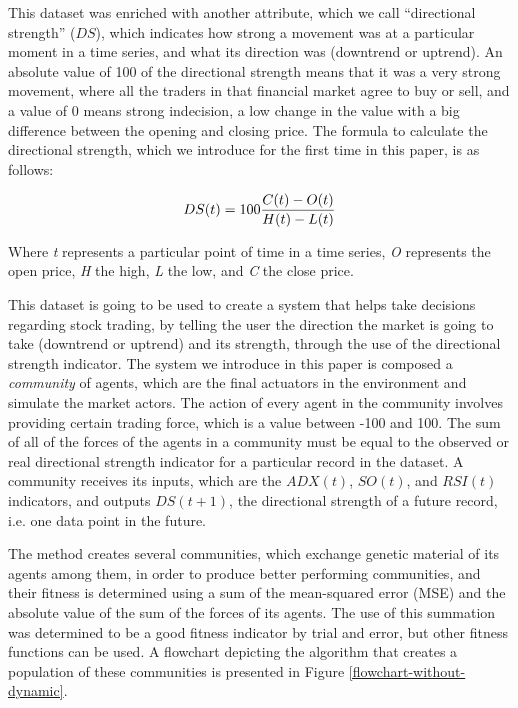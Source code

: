 \documentclass[a4paper,twoside]{article}
\begin{document}
This dataset was enriched with another attribute, which we call
``directional strength'' ($DS$), which indicates how strong a movement was at
a particular moment in a time series, and 
what its direction was (downtrend or uptrend). An absolute value of
100 of the directional strength means that it was a very strong
movement, where all the traders in that financial market agree to buy
or sell, and a value of 0 means strong indecision, a low change in the
value with a big difference between the opening and closing price.
The formula to calculate the directional strength, which we introduce
for the first time in this paper, is as follows: 

\begin{equation} \label{directional-strength}
  DS(t) = 100{{C(t) - O(t)} \over {H(t) - L(t)}}
\end{equation}

Where \textit{t} represents a particular point of time in a time
series, \textit{O} represents the open price, \textit{H} the high,
\textit{L} the low, and \textit{C} the close price.

This dataset is going to be used to create a system that helps take decisions
regarding stock trading, by telling the user the
direction the market is going to take (downtrend or uptrend) and
its strength, through the use of the directional strength
indicator. The system we introduce in this paper is composed a {\em
  community}  of agents,  which
are the final actuators in the environment and simulate the market
actors. The action of every agent in the community involves 
providing certain trading force, which is a value between -100 and
100. The sum of all of the forces of the agents in a community must be
equal to the observed or real directional strength indicator for a
particular record in the dataset. A community receives its inputs,
which are the $ADX(t)$, $SO(t)$, and $RSI(t)$ indicators,
and outputs  $DS(t+1)$, the directional strength of a
future record, i.e. one data point in the future. 

The method creates several communities, which exchange genetic
material of its agents among them, in order to produce better
performing communities, and their fitness is determined using a sum of
the mean-squared error (MSE) and the absolute value of the sum of the
forces of its agents. The use of this summation was determined to be a
good fitness indicator by trial and error, but other fitness functions
can be used. A flowchart depicting the algorithm that creates a
population of these communities is presented in Figure
\ref{flowchart-without-dynamic}. %
\end{document}
